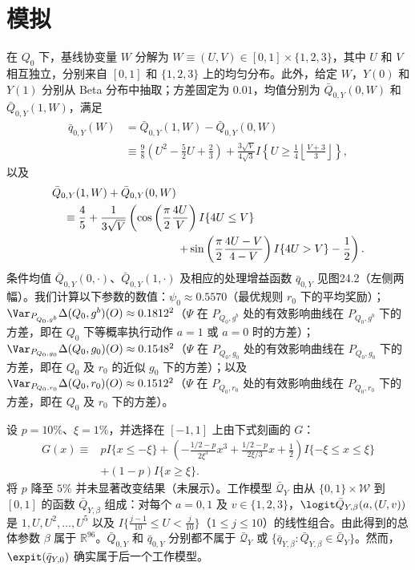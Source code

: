 \section{模拟}

在 $Q_0$ 下，基线协变量 $W$ 分解为 $W\equiv(U,V)\in[0,1]\times\{1,2,3\}$，其中 $U$ 和 $V$ 相互独立，分别来自 $[0,1]$ 和 $\{1,2,3\}$ 上的均匀分布。此外，给定 $W$，$Y(0)$ 和 $Y(1)$ 分别从 Beta 分布中抽取；方差固定为 $0.01$，均值分别为 $\bar Q_{0,Y}(0,W)$ 和 $\bar Q_{0,Y}(1,W)$，满足
\[
 \begin{aligned}
 \bar q_{0,Y}(W)&=\bar Q_{0,Y}(1,W)-\bar Q_{0,Y}(0,W)\\
 &\equiv\frac98\left(U^2-\frac52U+\frac23\right)
 +\frac{3\sqrt V}{4\sqrt3}I\left\{U\geq\frac14\left\lfloor\frac{V+3}{3}\right\rfloor\right\},
 \end{aligned}
\]
以及
\[
 \begin{aligned}
 &\bar Q_{0,Y}(1,W)+\bar Q_{0,Y}(0,W)\\
 &\quad\equiv\frac45+\frac1{3\sqrt V}\left(\cos\left(\frac\pi2\frac{4U}V\right)I\{4U\leq V\}\right. \\
 &\hspace{39mm}\left.+\sin\left(\frac\pi2\frac{4U-V}{4-V}\right)I\{4U>V\}-\frac12\right).
 \end{aligned}
\]
条件均值 $\bar Q_{0,Y}(0,\cdot)$、$\bar Q_{0,Y}(1,\cdot)$ 及相应的处理增益函数 $\bar q_{0,Y}$ 见图24.2（左侧两幅）。我们计算以下参数的数值：$\psi_0\approx0.5570$（最优规则 $r_0$ 下的平均奖励）；$\Var_{P_{Q_0,g^b}}\Delta(Q_0,g^b)(O)\approx0.1812^2$（$\Psi$ 在 $P_{Q_0,g^b}$ 处的有效影响曲线在 $P_{Q_0,g^b}$ 下的方差，即在 $Q_0$ 下等概率执行动作 $a=1$ 或 $a=0$ 时的方差）；$\Var_{P_{Q_0,g_0}}\Delta(Q_0,g_0)(O)\approx0.1548^2$（$\Psi$ 在 $P_{Q_0,g_0}$ 处的有效影响曲线在 $P_{Q_0,g_0}$ 下的方差，即在 $Q_0$ 及 $r_0$ 的近似 $g_0$ 下的方差）；以及 $\Var_{P_{Q_0,r_0}}\Delta(Q_0,r_0)(O)\approx0.1512^2$（$\Psi$ 在 $P_{Q_0,r_0}$ 处的有效影响曲线在 $P_{Q_0,r_0}$ 下的方差，即在 $Q_0$ 及 $r_0$ 下的方差）。

设 $p=10\%$、$\xi=1\%$，并选择在 $[-1,1]$ 上由下式刻画的 $G$：
\[
 \begin{aligned}
 G(x)\equiv{}&pI\{x\leq-\xi\}
 +\left(-\frac{1/2-p}{2\xi^3}x^3+\frac{1/2-p}{2\xi/3}x+\frac12\right)I\{-\xi\leq x\leq\xi\}\\
 &+(1-p)I\{x\geq\xi\}.
 \end{aligned}
\]
将 $p$ 降至 $5\%$ 并未显著改变结果（未展示）。工作模型 $\bar{\mathcal Q}_Y$ 由从 $\{0,1\}\times\mathcal W$ 到 $[0,1]$ 的函数 $\bar Q_{Y,\beta}$ 组成：对每个 $a=0,1$ 及 $v\in\{1,2,3\}$，$\logit\bar Q_{Y,\beta}(a,(U,v))$ 是 $1,U,U^2,\ldots,U^5$ 以及 $I\{\frac{j-1}{10}\leq U<\frac j{10}\}$（$1\leq j\leq10$）的线性组合。由此得到的总体参数 $\beta$ 属于 $\mathbb R^{96}$。$\bar Q_{0,Y}$ 和 $\bar q_{0,Y}$ 分别都不属于 $\bar{\mathcal Q}_Y$ 或 $\{\bar q_{Y,\beta}:\bar Q_{Y,\beta}\in\bar{\mathcal Q}_Y\}$。然而，$\expit(\bar q_{Y,0})$ 确实属于后一个工作模型。

